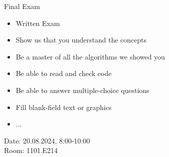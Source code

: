 \documentclass[aspectratio=169,handout]{../latex_main/tntbeamer}  %
\begin{document}
\begin{frame}[c]{Final Exam}

\begin{itemize}
  \item Written Exam
  \item Show us that you understand the concepts
  \item Be a master of all the algorithms we showed you
  \item Be able to read and check code
  \item Be able to answer multiple-choice questions
  \item Fill blank-field text or graphics
  \item ...
\end{itemize}

\vspace{1em}
\alert{Date:} 20.08.2024, 8:00-10:00\\
\alert{Room:} 1101.E214

\end{frame}
\end{document}
